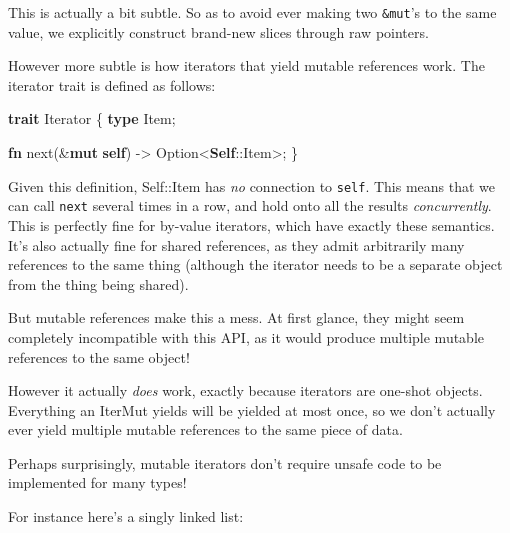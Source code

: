 \documentclass[a4paper,]{book}
\newenvironment{Shaded}{\begin{snugshade}}{\end{snugshade}}
\newcommand{\KeywordTok}[1]{\textcolor[rgb]{0.13,0.29,0.53}{\textbf{{#1}}}}
\newcommand{\DataTypeTok}[1]{\textcolor[rgb]{0.13,0.29,0.53}{{#1}}}
\newcommand{\BuiltInTok}[1]{{#1}}
\newcommand{\NormalTok}[1]{{#1}}
\begin{document}
This is actually a bit subtle. So as to avoid ever making two
\texttt{\&mut}'s to the same value, we explicitly construct brand-new
slices through raw pointers.

However more subtle is how iterators that yield mutable references work.
The iterator trait is defined as follows:

\begin{Shaded}
\begin{Highlighting}[]
\KeywordTok{trait} \BuiltInTok{Iterator} \NormalTok{\{}
    \KeywordTok{type} \NormalTok{Item;}

    \KeywordTok{fn} \NormalTok{next(&}\KeywordTok{mut} \KeywordTok{self}\NormalTok{) -> }\DataTypeTok{Option}\NormalTok{<}\KeywordTok{Self}\NormalTok{::Item>;}
\NormalTok{\}}
\end{Highlighting}
\end{Shaded}

Given this definition, Self::Item has \emph{no} connection to
\texttt{self}. This means that we can call \texttt{next} several times
in a row, and hold onto all the results \emph{concurrently}. This is
perfectly fine for by-value iterators, which have exactly these
semantics. It's also actually fine for shared references, as they admit
arbitrarily many references to the same thing (although the iterator
needs to be a separate object from the thing being shared).

But mutable references make this a mess. At first glance, they might
seem completely incompatible with this API, as it would produce multiple
mutable references to the same object!

However it actually \emph{does} work, exactly because iterators are
one-shot objects. Everything an IterMut yields will be yielded at most
once, so we don't actually ever yield multiple mutable references to the
same piece of data.

Perhaps surprisingly, mutable iterators don't require unsafe code to be
implemented for many types!

For instance here's a singly linked list:
\end{document}
